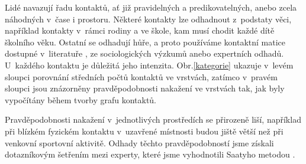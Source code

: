 Lidé navazují řadu kontaktů, ať již pravidelných a predikovatelných, anebo zcela náhodných v~čase i prostoru. 
Některé kontakty lze odhadnout z~podstaty věci, například kontakty v~rámci rodiny a ve škole, kam musí chodit každé dítě školního věku. Ostatní se odhadují hůře, a proto používáme kontaktní matice dostupné v~literatuře \cite{Prem_etal2017}, ze sociologických výzkumů anebo expertních odhadů. 
U~každého kontaktu je důležitá jeho intenzita. Obr.\ref{kategorie} ukazuje v~levém sloupci porovnání středních počtů kontaktů ve vrstvách, zatímco v~pravém sloupci jsou znázorněny pravděpodobnosti nakažení ve vrstvách tak, jak byly vypočítány během tvorby grafu kontaktů.


Pravděpodobnosti nakažení v~jednotlivých prostředích se přirozeně liší, například při blízkém fyzickém kontaktu v~uzavřené místnosti budou jiště větší než při venkovní sportovní aktivitě. Odhady těchto pravděpodobností jsme získali dotazníkovým šet\-ře\-ním mezi experty, které jsme vyhodnotili Saatyho metodou \cite{M-techrep2021}.

